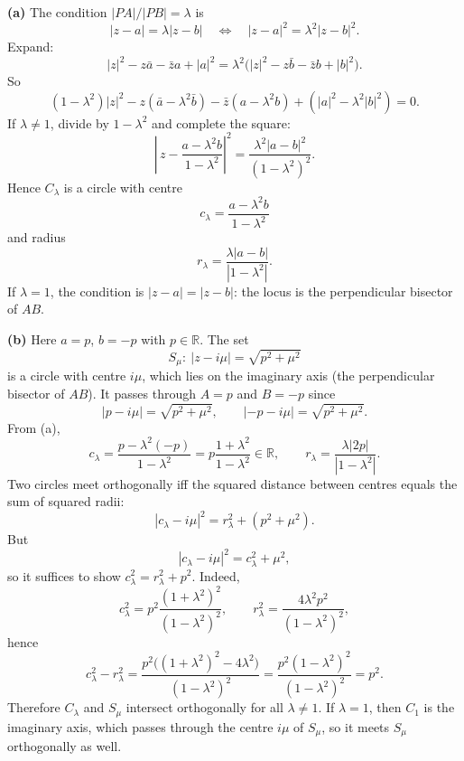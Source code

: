 \begin{solution}
\textbf{(a)} The condition \(|PA|/|PB|=\lambda\) is
\[
|z-a|=\lambda |z-b|
\quad\Longleftrightarrow\quad
|z-a|^2=\lambda^2|z-b|^2.
\]
Expand:
\[
|z|^2- z\bar a-\bar z a+|a|^2=\lambda^2\bigl(|z|^2-z\bar b-\bar z b+|b|^2\bigr).
\]
So
\[
(1-\lambda^2)|z|^2- z(\bar a-\lambda^2\bar b)-\bar z(a-\lambda^2 b)+(|a|^2-\lambda^2|b|^2)=0.
\]
If \(\lambda\neq 1\), divide by \(1-\lambda^2\) and complete the square:
\[
\left|\,z-\frac{a-\lambda^2 b}{\,1-\lambda^2\,}\right|^2
=\frac{\lambda^2|a-b|^2}{(1-\lambda^2)^2}.
\]
Hence \(C_\lambda\) is a circle with centre
\[
c_\lambda=\frac{a-\lambda^2 b}{1-\lambda^2}
\]
and radius
\[
r_\lambda=\frac{\lambda|a-b|}{|1-\lambda^2|}.
\]
If \(\lambda=1\), the condition is \(|z-a|=|z-b|\): the locus is the perpendicular bisector of \(AB\).

\medskip
\noindent\textbf{(b)} Here \(a=p\), \(b=-p\) with \(p\in\mathbb R\). The set
\[
S_\mu:\ |z-i\mu|=\sqrt{p^2+\mu^2}
\]
is a circle with centre \(i\mu\), which lies on the imaginary axis (the perpendicular bisector of \(AB\)).
It passes through \(A=p\) and \(B=-p\) since
\[
|p-i\mu|=\sqrt{p^2+\mu^2},\qquad |-p-i\mu|=\sqrt{p^2+\mu^2}.
\]
From (a),
\[
c_\lambda=\frac{p-\lambda^2(-p)}{1-\lambda^2}=p\frac{1+\lambda^2}{1-\lambda^2}\in\mathbb R,\qquad
r_\lambda=\frac{\lambda|2p|}{|1-\lambda^2|}.
\]
Two circles meet orthogonally iff the squared distance between centres equals the sum of squared radii:
\[
|c_\lambda-i\mu|^2=r_\lambda^2+(p^2+\mu^2).
\]
But
\[
|c_\lambda-i\mu|^2=c_\lambda^2+\mu^2,
\]
so it suffices to show \(c_\lambda^2=r_\lambda^2+p^2\). Indeed,
\[
c_\lambda^2=p^2\frac{(1+\lambda^2)^2}{(1-\lambda^2)^2},\qquad
r_\lambda^2=\frac{4\lambda^2p^2}{(1-\lambda^2)^2},
\]
hence
\[
c_\lambda^2-r_\lambda^2
=\frac{p^2\bigl((1+\lambda^2)^2-4\lambda^2\bigr)}{(1-\lambda^2)^2}
=\frac{p^2(1-\lambda^2)^2}{(1-\lambda^2)^2}
=p^2.
\]
Therefore \(C_\lambda\) and \(S_\mu\) intersect orthogonally for all \(\lambda\neq 1\).
If \(\lambda=1\), then \(C_1\) is the imaginary axis, which passes through the centre \(i\mu\) of \(S_\mu\),
so it meets \(S_\mu\) orthogonally as well.
\end{solution}

